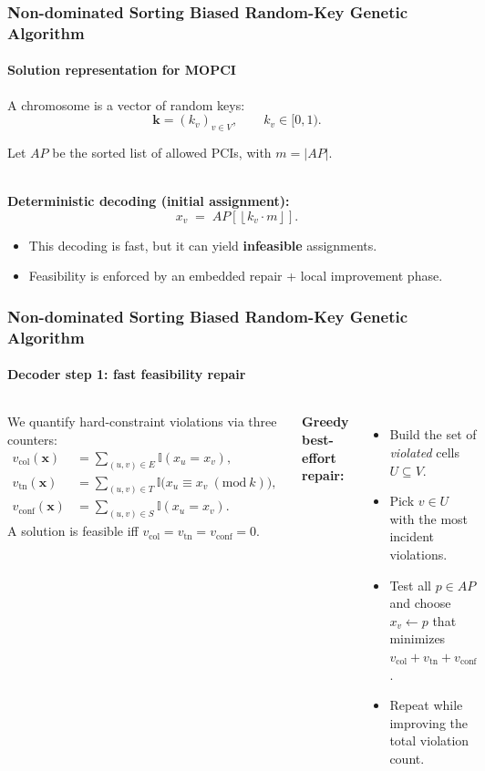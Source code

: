 \documentclass[
	11pt, %
	aspectratio=169, %
]{beamer}
\begin{document}
\begin{frame}
\frametitle{Non-dominated Sorting Biased Random-Key Genetic Algorithm}
\framesubtitle{Solution representation for MOPCI}

A chromosome is a vector of random keys:
\[
\mathbf{k} = (k_{v})_{v \in V}, \qquad k_{v} \in [0, 1).
\]

Let $AP$ be the sorted list of allowed PCIs, with $m = |AP|$.

~\\

\textbf{Deterministic decoding (initial assignment):}
\[
x_{v} \;=\; AP\!\left[\left\lfloor k_{v} \cdot m \right\rfloor\right].
\]

\begin{itemize}
\item This decoding is fast, but it can yield \textbf{infeasible} assignments.
\item Feasibility is enforced by an embedded repair + local improvement phase.
\end{itemize}

\end{frame}

\begin{frame}
\frametitle{Non-dominated Sorting Biased Random-Key Genetic Algorithm}
\framesubtitle{Decoder step 1: fast feasibility repair}

\begin{columns}[c,onlytextwidth]
We quantify hard-constraint violations via three counters:
\vspace{-0.4em}
\[
\begin{aligned}
v_{\mathrm{col}}(\mathbf{x})  &= \sum_{(u, v) \in E}\mathbb{I}(x_{u} = x_{v}),\\
v_{\mathrm{tn}}(\mathbf{x})   &= \sum_{(u, v) \in T}\mathbb{I}\big(x_{u} \equiv x_{v}\ (\mathrm{mod}\ k)\big),\\
v_{\mathrm{conf}}(\mathbf{x}) &= \sum_{(u, v) \in S}\mathbb{I}(x_{u} = x_{v}).
\end{aligned}
\]
\vspace{-0.6em}
A solution is feasible iff $v_{\mathrm{col}} = v_{\mathrm{tn}} = v_{\mathrm{conf}} = 0$.

\textbf{Greedy best-effort repair:}
\begin{itemize}
\item Build the set of \emph{violated} cells $U \subseteq V$.
\item Pick $v \in U$ with the most incident violations.
\item Test all $p \in AP$ and choose $x_{v} \leftarrow p$ that minimizes $v_{\mathrm{col}} + v_{\mathrm{tn}} + v_{\mathrm{conf}}$.
\item Repeat while improving the total violation count.
\end{itemize}
\end{columns}
\end{frame}
\end{document}
